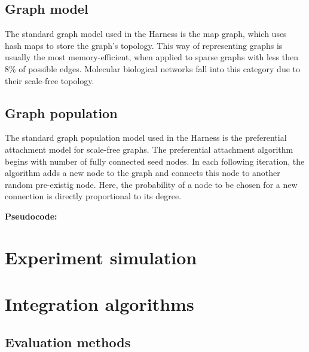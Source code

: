 \documentclass{scrartcl}
\begin{document}
\subsection{Graph model}
\label{graph model}
The standard graph model used in the Harness is the map graph, which uses hash maps to store the graph's topology. This way of representing graphs is usually the most memory-efficient, when applied to sparse graphs with less then 8\% of possible edges. Molecular biological networks fall into this category due to their scale-free topology.


\subsection{Graph population}
\label{graph population}

The standard graph population model used in the Harness is the preferential attachment model for scale-free graphs. The preferential attachment algorithm begins with number of fully connected seed nodes. In each following iteration, the algorithm adds a new node to the graph and connects this node to another random pre-existig node. Here, the probability of a node to be chosen for a new connection is directly proportional to its degree.

\textbf{Pseudocode:}\\
\fbox{\parbox{\textwidth}{\scriptsize }}

\section{Experiment simulation}


\section{Integration algorithms}

\subsection{Evaluation methods}
\end{document}
